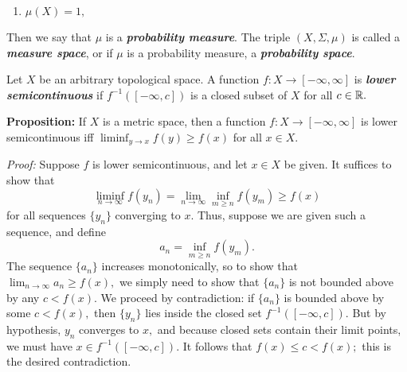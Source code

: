\documentclass{article}
\begin{document}
\begin{enumerate}[noitemsep,topsep=\mdcompacttopsep,start=3]%

\item{}$\mu(X) = 1,$%
\end{enumerate}%

\noindent{}Then we say that $\mu$ is a \textbf{\emph{probability measure}}. The triple $(X, \Sigma, \mu)$ is called a \textbf{\emph{measure space}}, or if $\mu$ is a probability measure, a \textbf{\emph{probability space}}.%

\mdhr{}%

\noindent{}Let $X$ be an arbitrary topological space. A function $f: X \to [-\infty, \infty]$ is \textbf{\emph{lower semicontinuous}} if $f^{-1}([-\infty, c])$ is a closed subset of $X$ for all $c \in \mathbb{R}.$%

\textbf{Proposition:} If $X$ is a metric space, then a function $f: X \to [-\infty, \infty]$ is lower semicontinuous iff $\displaystyle \liminf_{y \to x} f(y) \ge f(x)$ for all $x \in X.$%

\emph{Proof:} Suppose $f$ is lower semicontinuous, and let $x \in X$ be given. It suffices to show that%
\noindent\noindent\[%
\liminf_{n \to \infty} f(y_n) = \lim_{n \to \infty} \inf_{m \ge n} f(y_m) \ge f(x)
\]%
\noindent{}for all sequences $\{y_n\}$ converging to $x.$ Thus, suppose we are given such a sequence, and define
\noindent\noindent\[%
a_n = \inf_{m \ge n} f(y_m).
\]%
\noindent{}The sequence $\{a_n\}$ increases monotonically, so to show that $\lim_{n \to \infty} a_n \ge f(x),$ we simply need to show that $\{a_n\}$ is not bounded above by any $c < f(x).$ We proceed by contradiction: if $\{a_n\}$ is bounded above by some $c < f(x),$ then $\{y_n\}$ lies inside the closed set $f^{-1}([-\infty, c]).$ But by hypothesis, $y_n$ converges to $x,$ and because closed sets contain their limit points, we must have $x \in f^{-1}([-\infty, c]).$ It follows that $f(x) \le c < f(x);$ this is the desired contradiction.
\end{document}
